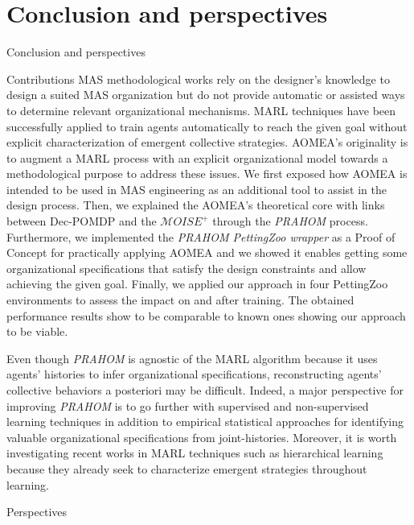 \section{Conclusion and perspectives}
\begin{frame}{Conclusion and perspectives}
    {}

    \begin{block}{Contributions}
        MAS methodological works rely on the designer's knowledge to design a suited MAS organization but do not provide automatic or assisted ways to determine relevant organizational mechanisms.
        MARL techniques have been successfully applied to train agents automatically to reach the given goal without explicit characterization of emergent collective strategies.
        AOMEA's originality is to augment a MARL process with an explicit organizational model towards a methodological purpose to address these issues. We first exposed how AOMEA is intended to be used in MAS engineering as an additional tool to assist in the design process.
        Then, we explained the AOMEA's theoretical core with links between Dec-POMDP and the $\mathcal{M}OISE^+$ through the \emph{PRAHOM} process.
        Furthermore, we implemented the \emph{PRAHOM PettingZoo wrapper} as a Proof of Concept for practically applying AOMEA and we showed it enables getting some organizational specifications that satisfy the design constraints and allow achieving the given goal.
        Finally, we applied our approach in four PettingZoo environments to assess the impact on and after training. The obtained performance results show to be comparable to known ones showing our approach to be viable.

        Even though \emph{PRAHOM} is agnostic of the MARL algorithm because it uses agents' histories to infer organizational specifications, reconstructing agents' collective behaviors a posteriori may be difficult. Indeed, a major perspective for improving \emph{PRAHOM} is to go further with supervised and non-supervised learning techniques in addition to empirical statistical approaches for identifying valuable organizational specifications from joint-histories. Moreover, it is worth investigating recent works in MARL techniques such as hierarchical learning because they already seek to characterize emergent strategies throughout learning.
    \end{block}

    \begin{alertblock}{Perspectives}

    \end{alertblock}

\end{frame}
